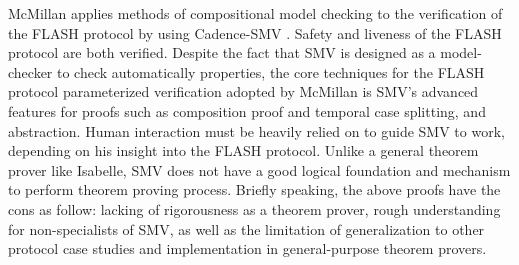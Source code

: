 \documentclass{llncs}
\newcommand{\forget}[1]{}
\begin{document}
McMillan applies methods of compositional model
checking \cite{McMillan2001} to the verification of the FLASH protocol by using Cadence-SMV \cite{cadenceSMV}. %
Safety and liveness of the
FLASH protocol are both verified. Despite the fact that SMV is designed as a model-checker to  check automatically properties, the core techniques for the FLASH protocol parameterized verification adopted by McMillan is SMV's advanced features for proofs such as composition proof and temporal case splitting, and abstraction. Human interaction must be heavily relied on to  guide SMV to work, depending on his insight into the FLASH protocol. Unlike a general theorem prover like Isabelle, SMV does not have a good logical foundation and mechanism to perform theorem proving process. Briefly speaking, the above proofs have the cons as follow: lacking of rigorousness as a theorem prover, rough understanding for non-specialists of SMV, as well as the limitation of generalization to other protocol case studies and implementation in general-purpose theorem provers. \forget{The above proofs are neither rigorous as a theorem prover, nor easily understood to a non-specialist of SMV.  Because these proof techniques are  only special for SMV,  they are  difficult to be generalized to other protocols and to be implemented in a general-purpose theorem prover.}
\end{document}
